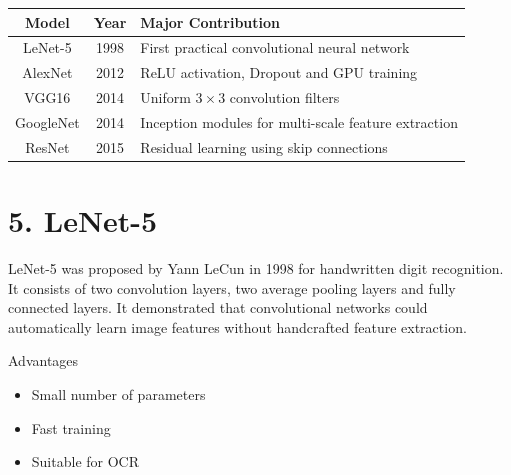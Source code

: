 \documentclass[11pt]{article}
\begin{document}
\begin{center}

\begin{tabular}{|c|c|p{7cm}|}

\hline

Model & Year & Major Contribution\\

\hline

LeNet-5 & 1998 &
First practical convolutional neural network\\

\hline

AlexNet & 2012 &
ReLU activation, Dropout and GPU training\\

\hline

VGG16 & 2014 &
Uniform $3\times3$ convolution filters\\

\hline

GoogleNet & 2014 &
Inception modules for multi-scale feature extraction\\

\hline

ResNet & 2015 &
Residual learning using skip connections\\

\hline

\end{tabular}

\end{center}


\section*{5. LeNet-5}

LeNet-5 was proposed by Yann LeCun in 1998 for handwritten digit
recognition. It consists of two convolution layers, two average pooling
layers and fully connected layers. It demonstrated that convolutional
networks could automatically learn image features without handcrafted
feature extraction.

Advantages

\begin{itemize}

\item Small number of parameters

\item Fast training

\item Suitable for OCR

\end{itemize}
\end{document}
